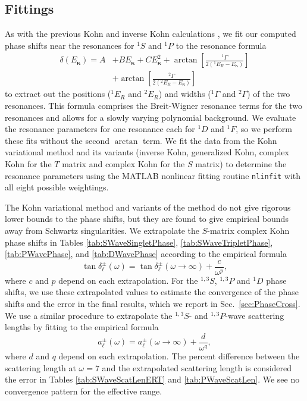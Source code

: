\documentclass[preprint,showpacs,showkeys,preprintnumbers,amsmath,amssymb,longbibliography,pra,aps]{revtex4-1}
\begin{document}
\subsection{Fittings}
As with the previous Kohn and inverse Kohn calculations
\cite{VanReeth2004},
we fit our computed phase shifts near the resonances for
$^1S$ and $^1P$ to the resonance formula
\begin{align}
\label{eq:ResonanceFit}
\delta(E_{\bm \kappa}) = A &+ B E_{\bm \kappa} + C E_{\bm \kappa}^2 + \arctan
  \left[ \frac{^1\Gamma}{2(^1E_R - E_{\bm \kappa})} \right]  \nonumber \\
& + \arctan \left[ \frac{^2\Gamma}{2(^2E_R - E_{\bm \kappa})} \right]
\end{align}
to extract out the positions ($^1E_R$ and $^2E_R$) and widths ($^1\Gamma$ and 
$^2\Gamma$) of the two resonances. This formula comprises the
Breit-Wigner resonance terms
\cite{VanReeth2004,Breit1936,Macek1970,Hazi1979} for the two
resonances and allows for a slowly varying polynomial background.
We evaluate the resonance parameters for one resonance each for $^1D$ and
$^1F$, so we perform these fits without the second $\arctan$ term.
We fit the data from the Kohn variational method and its variants
(inverse Kohn, generalized Kohn, complex Kohn for the $T$ 
matrix and complex Kohn for the $S$ matrix) to determine the resonance
parameters
using the MATLAB \cite{MATLAB} nonlinear fitting routine 
\texttt{nlinfit} with all eight possible weightings.

The Kohn variational method and variants of the method do not give 
rigorous lower bounds to the phase shifts, but they are found to give 
empirical bounds away from Schwartz singularities. We extrapolate
the $S$-matrix complex Kohn phase
shifts in Tables \ref{tab:SWaveSingletPhase}, \ref{tab:SWaveTripletPhase},
\ref{tab:PWavePhase}, and \ref{tab:DWavePhase} according to the 
empirical formula \cite{Armour1991,VanReeth2003}
\begin{equation}
\label{eq:Extrap}
\tan\delta_\ell^\pm(\omega) = \tan\delta_\ell^\pm(\omega\to\infty) +
  \frac{c}{\omega^p},
\end{equation}
where $c$ and $p$ depend on each extrapolation.
For the $^{1,3}S$, $^{1,3}P$ and $^1D$ phase shifts,
we use these extrapolated values to estimate the convergence of the phase 
shifts and the error in the final results, which we report in
Sec.~\ref{sec:PhaseCross}. We use a similar procedure to
extrapolate the $^{1,3}S$- and $^{1,3}P$-wave scattering lengths by
fitting to the empirical formula \cite{VanReeth2003}
\begin{equation}
\label{eq:ExtrapA}
a_\ell^\pm(\omega) = a_\ell^\pm(\omega\to\infty) + \frac{d}{\omega^q},
\end{equation}
where $d$ and $q$ depend on each extrapolation.
The percent difference between the scattering length at $\omega = 7$
and the extrapolated scattering 
length is considered the error in Tables \ref{tab:SWaveScatLenERT} and
\ref{tab:PWaveScatLen}. We see no convergence pattern for the effective range.
\end{document}
